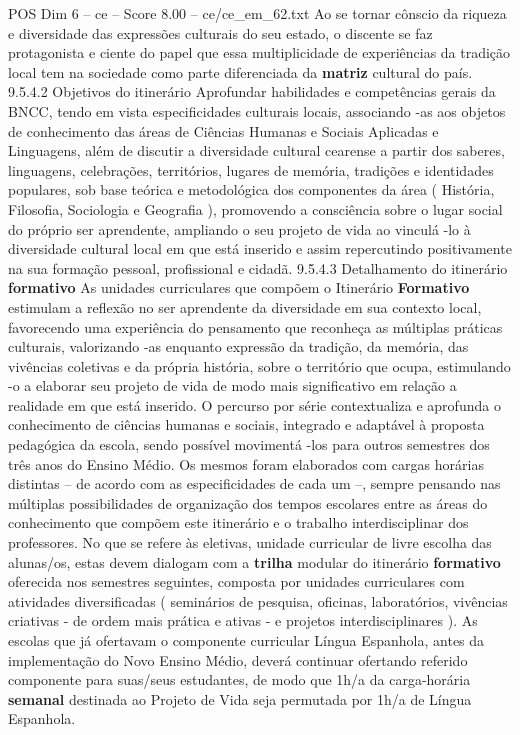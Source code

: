 \begin{textsample}{POS Dim 6 – ce – Score 8.00 – ce/ce\_em\_62.txt}
Ao se tornar cônscio da riqueza e diversidade das expressões culturais do seu estado, o discente se faz protagonista e ciente do papel que essa multiplicidade de experiências da tradição local tem na sociedade como parte diferenciada da \textbf{matriz} cultural do país. 9.5.4.2 Objetivos do itinerário Aprofundar habilidades e competências gerais da BNCC, tendo em vista especificidades culturais locais, associando -as aos objetos de conhecimento das áreas de Ciências Humanas e Sociais Aplicadas e Linguagens, além de discutir a diversidade cultural cearense a partir dos saberes, linguagens, celebrações, territórios, lugares de memória, tradições e identidades populares, sob base teórica e metodológica dos componentes da área ( História, Filosofia, Sociologia e Geografia ), promovendo a consciência sobre o lugar social do próprio ser aprendente, ampliando o seu projeto de vida ao vinculá -lo à diversidade cultural local em que está inserido e assim repercutindo positivamente na sua formação pessoal, profissional e cidadã. 9.5.4.3 Detalhamento do itinerário \textbf{formativo} As unidades curriculares que compõem o Itinerário \textbf{Formativo} estimulam a reflexão no ser aprendente da diversidade em sua contexto local, favorecendo uma experiência do pensamento que reconheça as múltiplas práticas culturais, valorizando -as enquanto expressão da tradição, da memória, das vivências coletivas e da própria história, sobre o território que ocupa, estimulando -o a elaborar seu projeto de vida de modo mais significativo em relação a realidade em que está inserido.
O percurso por série contextualiza e aprofunda o conhecimento de ciências humanas e sociais, integrado e adaptável à proposta pedagógica da escola, sendo possível movimentá -los para outros semestres dos três anos do Ensino Médio.
Os mesmos foram elaborados com cargas horárias distintas – de acordo com as especificidades de cada um –, sempre pensando nas múltiplas possibilidades de organização dos tempos escolares entre as áreas do conhecimento que compõem este itinerário e o trabalho interdisciplinar dos professores.
No que se refere às eletivas, unidade curricular de livre escolha das alunas/os, estas devem dialogam com a \textbf{trilha} modular do itinerário \textbf{formativo} oferecida nos semestres seguintes, composta por unidades curriculares com atividades diversificadas ( seminários de pesquisa, oficinas, laboratórios, vivências criativas - de ordem mais prática e ativas - e projetos interdisciplinares ).
As escolas que já ofertavam o componente curricular Língua Espanhola, antes da implementação do Novo Ensino Médio, deverá continuar ofertando referido componente para suas/seus estudantes, de modo que 1h/a da carga-horária \textbf{semanal} destinada ao Projeto de Vida seja permutada por 1h/a de Língua Espanhola.

\end{textsample}
